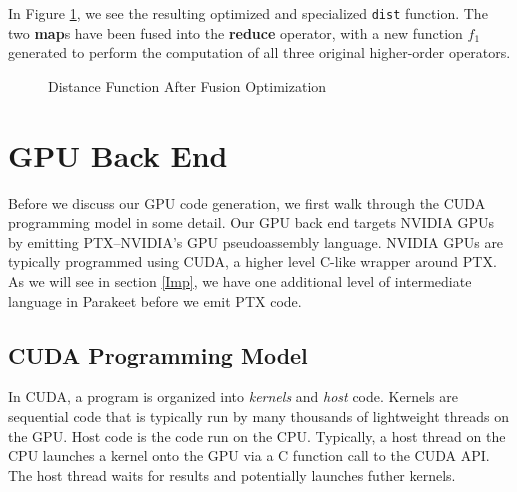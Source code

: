 \documentclass[preprint]{sigplanconf}
\begin{document}
In Figure \ref{DistFuse}, we see the resulting optimized and specialized
\texttt{dist} function. The two \textbf{map}s have been fused into the
\textbf{reduce} operator, with a new function $f_1$ generated to perform the
computation of all three original higher-order operators.

\begin{figure}[h!]

\caption{Distance Function After Fusion Optimization}
\label{DistFuse}
\end{figure}

\section{GPU Back End}
Before we discuss our GPU code generation, we first walk through the CUDA
programming model in some detail.  Our GPU back end targets NVIDIA GPUs by
emitting PTX--NVIDIA's GPU pseudoassembly language.  NVIDIA GPUs are typically
programmed using CUDA, a higher level C-like wrapper around PTX.  As we will
see in section \ref{Imp}, we have one additional level of intermediate language
in Parakeet before we emit PTX code.

\subsection{CUDA Programming Model}

In CUDA, a program is organized into {\it kernels} and {\it host} code.
Kernels are sequential code that is typically run by many thousands of
lightweight threads on the GPU.  Host code is the code run on the CPU.
Typically, a host thread on the CPU launches a kernel onto the GPU via a C
function call to the CUDA API.  The host thread waits for results and
potentially launches futher kernels.
\end{document}
